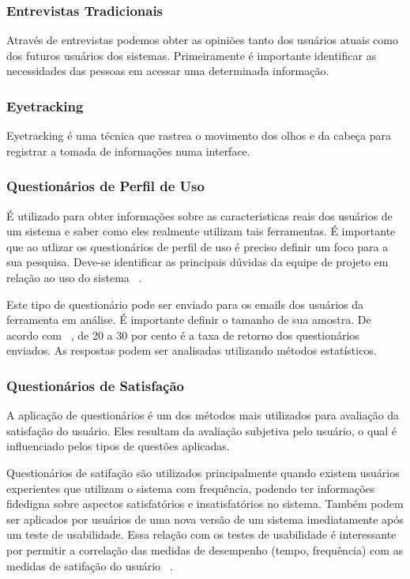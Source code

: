 \subsubsection{Entrevistas Tradicionais}

Através de entrevistas podemos obter as opiniões tanto dos usuários atuais como dos futuros usuários dos sistemas. Primeiramente é importante identificar as necessidades das pessoas em acessar uma determinada informação.

\subsubsection{Eyetracking}

Eyetracking é uma técnica que rastrea o movimento dos olhos e da cabeça para registrar a tomada de informações numa interface.

\subsubsection{Questionários de Perfil de Uso}
 
É utilizado para obter informações sobre as caracteristicas reais dos usuários de um sistema e saber como eles realmente utilizam tais ferramentas. É importante que ao utlizar os questionários de perfil de uso é preciso definir um foco para a sua pesquisa. Deve-se identificar as principais dúvidas da equipe de projeto em relação ao uso do sistema ~\cite{cybis2010}.

Este tipo de questionário pode ser enviado para os emails dos usuários da ferramenta em análise. É importante definir o tamanho de sua amostra. De acordo com ~, de 20 a 30 por cento é a taxa de retorno dos questionários enviados. As respostas podem ser analisadas utilizando métodos estatísticos.


\subsubsection{Questionários de Satisfação}

	A aplicação de questionários é um dos métodos mais utilizados para avaliação da satisfação do usuário. Eles resultam da avaliação subjetiva pelo usuário, o qual é influenciado pelos tipos de questões aplicadas.
	
	Questionários de satifação são utilizados principalmente quando existem usuários experientes que utilizam o sistema com frequência, podendo ter informações fidedigna sobre aspectos satisfatórios e insatisfatórios no sistema. Também podem ser aplicados por usuários de uma nova versão de um sistema imediatamente após um teste de usabilidade. Essa relação com os testes de usabilidade é interessante por permitir a correlação das medidas de desempenho (tempo, frequência) com as medidas de satifação do usuário ~\cite{cybis2010}.

